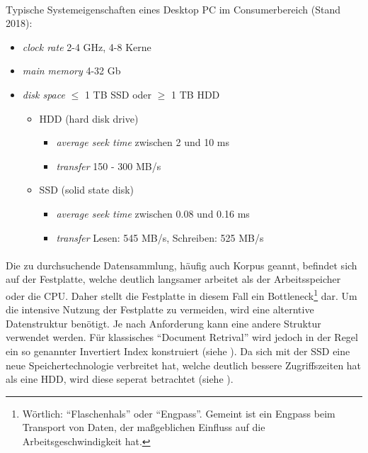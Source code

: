 \paragraph{}
Typische Systemeigenschaften eines Desktop PC im Consumerbereich (Stand 2018):
\begin{itemize}
	\item \textit{clock rate} 2-4 GHz, 4-8 Kerne
	\item \textit{main memory} 4-32 Gb
	\item \textit{disk space} $\leq$ 1 TB SSD oder $\geq$ 1 TB HDD
	\begin{itemize}
	\item HDD (hard disk drive)
	\begin{itemize}
	\item \textit{average seek time} zwischen 2 und 10 ms
	\item \textit{transfer} 150 - 300 MB/s
	\end{itemize}
	\item SSD (solid state disk)
	\begin{itemize}
	\item \textit{average seek time} zwischen 0.08 und 0.16 ms
	\item \textit{transfer} Lesen: 545 MB/s, Schreiben: 525 MB/s
	\end{itemize}
	\end{itemize}
\end{itemize}	 
\par

\paragraph{}
Die zu durchsuchende Datensammlung, häufig auch Korpus geannt, befindet sich auf der Festplatte, welche deutlich langsamer arbeitet als der Arbeitsspeicher oder die CPU. Daher stellt die Festplatte in diesem Fall ein Bottleneck\footnote{Wörtlich: \enquote{Flaschenhals} oder \enquote{Engpass}. Gemeint ist ein Engpass beim Transport von Daten, der maßgeblichen Einfluss auf die Arbeitsgeschwindigkeit hat.} dar.
Um die intensive Nutzung der Festplatte zu vermeiden, wird eine alterntive Datenstruktur benötigt. Je nach Anforderung kann eine andere Struktur verwendet werden. Für klassisches \enquote{Document Retrival} wird jedoch in der Regel ein so genannter Invertiert Index konstruiert (siehe ).
Da sich mit der SSD eine neue Speichertechnologie verbreitet hat, welche deutlich bessere Zugriffszeiten hat als eine HDD, wird diese seperat betrachtet (siehe ).
\par

